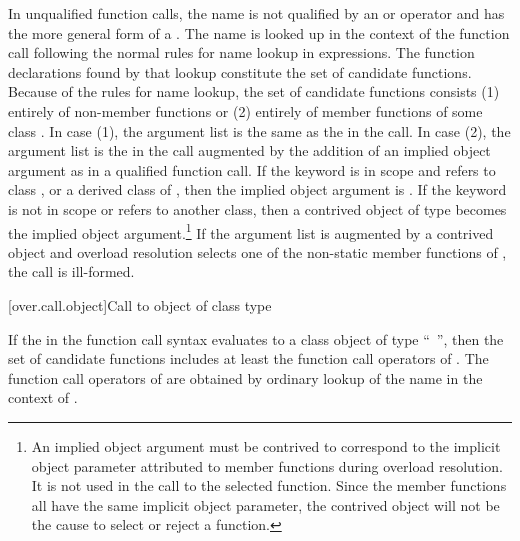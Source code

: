 \pnum
In unqualified function calls, the name is not qualified by an
\tcode{->}
or
operator and has the more general form of a
.
The name is looked up in the context of the function
call following the normal rules for name lookup
in expressions.
The function declarations found by that lookup constitute the
set of candidate functions.
Because of the rules for name lookup, the set of candidate functions
consists (1) entirely of non-member functions or (2) entirely of
member functions of some class
.
In case (1),
the argument list is
the same as the
in the call.
In case (2), the argument list is the
in the call augmented by the addition of an implied object
argument as in a qualified function call.
If the keyword
 is in scope and refers to
class
,
or a derived class of
,
then the implied object argument is
.
If the keyword
is not in
scope or refers to another class, then
a contrived object of type
becomes the implied object
argument.\footnote{An implied object argument must be contrived to
correspond to the implicit object
parameter attributed to member functions during overload resolution.
It is not
used in
the call to the selected function.
Since the member functions all have the
same implicit
object parameter, the contrived object will not be the cause to select or
reject a
function.}
If the argument list is augmented by a contrived object and overload
resolution selects one of the non-static member functions of
,
the call is ill-formed.

[over.call.object]{Call to object of class type}

\pnum
If the  
in the function call syntax evaluates
to a class object of type ``\cv{}~'',
then the set of candidate functions
includes at least the function call operators of .
The function call operators of 
are obtained by ordinary lookup of the name 
in the context of .

